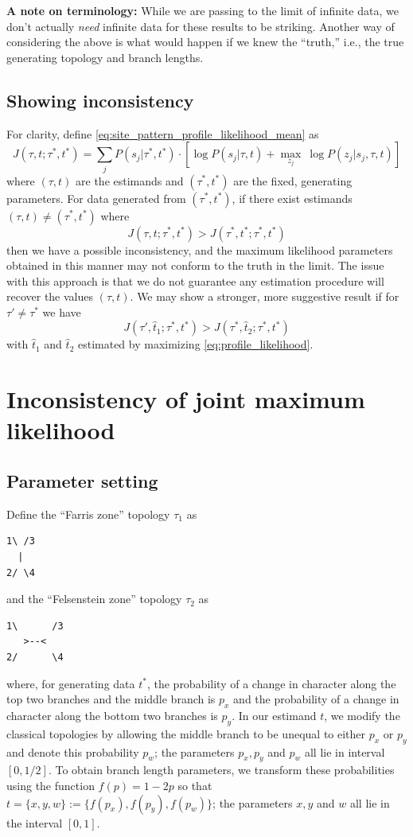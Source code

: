 \documentclass[a4paper]{article}
\begin{document}
\textbf{A note on terminology:}  While we are passing to the limit of infinite data, we don't actually \emph{need} infinite data for these results to be striking. Another way of considering the above is what would happen if we knew the ``truth,'' i.e., the true generating topology and branch lengths.

\subsection{Showing inconsistency}

For clarity, define \eqref{eq:site_pattern_profile_likelihood_mean} as
$$
J(\tau, t; \tau^*, t^*) = \sum_{j} P(s_j | \tau^*, t^*) \cdot [\log P(s_j | \tau, t) + \max_{z_j} \ \log P(z_j | s_j, \tau, t)]
$$
where $(\tau, t)$ are the estimands and $(\tau^*, t^*)$ are the fixed, generating parameters.
For data generated from $(\tau^*, t^*)$, if there exist estimands $(\tau,t)\neq(\tau^*,t^*)$ where
$$
J(\tau, t; \tau^*, t^*) > J(\tau^*, t^*; \tau^*, t^*)
$$
then we have a possible inconsistency, and the maximum likelihood parameters obtained in this manner may not conform to the truth in the limit.
The issue with this approach is that we do not guarantee any estimation procedure will recover the values $(\tau, t)$.
We may show a stronger, more suggestive result if for $\tau'\neq\tau^*$ we have
\begin{equation}
\label{eq:inconsistency_inequality}
J(\tau', \hat{t}_1; \tau^*, t^*) > J(\tau^*, \hat{t}_2; \tau^*, t^*)
\end{equation}
with $\hat{t}_1$ and $\hat{t}_2$ estimated by maximizing \eqref{eq:profile_likelihood}.

\section{Inconsistency of joint maximum likelihood}

\subsection{Parameter setting}

Define the ``Farris zone'' topology $\tau_1$ as \cite{farris}
\begin{verbatim}
1\ /3
  | 
2/ \4
\end{verbatim}
and the ``Felsenstein zone'' topology $\tau_2$ as \cite{felsenstein}
\begin{verbatim}
1\      /3
   >--< 
2/      \4
\end{verbatim}
where, for generating data $t^*$, the probability of a change in character along the top two branches and the middle branch is $p_x$ and the probability of a change in character along the bottom two branches is $p_y$.
In our estimand $t$, we modify the classical topologies by allowing the middle branch to be unequal to either $p_x$ or $p_y$ and denote this probability $p_w$; the parameters $p_x, p_y$ and $p_w$ all lie in interval $[0,1/2]$.
To obtain branch length parameters, we transform these probabilities using the function $f(p)=1-2p$ so that $t=\{x,y,w\}:=\{f(p_x), f(p_y), f(p_w)\}$; the parameters $x, y$ and $w$ all lie in the interval $[0,1]$.
\end{document}
